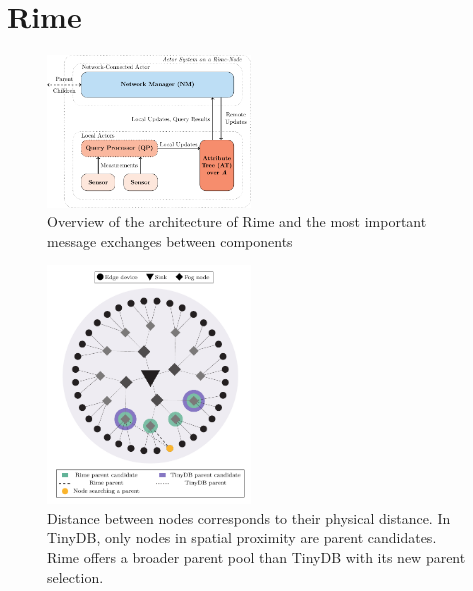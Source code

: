 \section{Rime}
\label{sec:design}
% 
\begin{figure}[t]
  \centering
  \includegraphics[width=0.48\textwidth]{img/vliot-rime-architecture/vliot-rime-architecture.pdf}
  \caption{Overview of the architecture of Rime and the most important message exchanges between components}
  \label{fig:rime-architecture}
\end{figure}
%
\begin{figure}[t]
  \centering
  \includegraphics[width=0.48\textwidth]{img/vliot-rime-vs-tinydb/rime-vs-tinydb.pdf}
  \caption{Distance between nodes corresponds to their physical distance. In TinyDB, only nodes in spatial proximity are parent candidates. Rime offers a broader parent pool than TinyDB with its new parent selection.}
  \label{fig:rime-vs-tinydb}
\end{figure}

